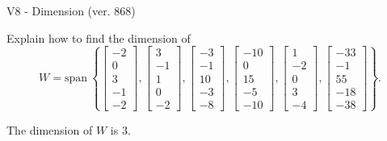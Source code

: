 \begin{exercise}
  \begin{exerciseTitle}V8 - Dimension (ver. 868)\end{exerciseTitle}
  \begin{exerciseStatement}
    Explain how to find the dimension of 
\[W=\mathrm{span}\ \left\{\left[\begin{array}{r}
-2 \\
0 \\
3 \\
-1 \\
-2
\end{array}\right] , \left[\begin{array}{r}
3 \\
-1 \\
1 \\
0 \\
-2
\end{array}\right] , \left[\begin{array}{r}
-3 \\
-1 \\
10 \\
-3 \\
-8
\end{array}\right] , \left[\begin{array}{r}
-10 \\
0 \\
15 \\
-5 \\
-10
\end{array}\right] , \left[\begin{array}{r}
1 \\
-2 \\
0 \\
3 \\
-4
\end{array}\right] , \left[\begin{array}{r}
-33 \\
-1 \\
55 \\
-18 \\
-38
\end{array}\right]\right\}.\]



  \end{exerciseStatement}
  \begin{exerciseAnswer}
   The dimension of \(W\) is  \(3\).
  


  \end{exerciseAnswer}
\end{exercise}